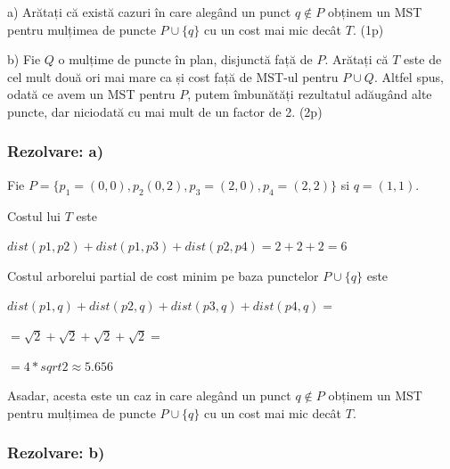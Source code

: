 \documentclass[a4paper]{article}
\begin{document}
a) Arătați că există cazuri în care alegând un punct $q \notin P$ obținem un
MST pentru mulțimea de puncte $P\cup\{q\}$ cu un cost mai mic decât
$T$. \hfill (1p)

b) Fie $Q$ o mulțime de puncte în plan, disjunctă față de $P$. Arătați că $T$
este de cel mult două ori mai mare ca și cost față de MST-ul pentru
$P \cup Q$. Altfel spus, odată ce avem un MST pentru $P$, putem îmbunătăți rezultatul adăugând alte puncte, dar niciodată cu mai mult de
un factor de 2. \hfill (2p)

\subsubsection*{Rezolvare: a)}
\begin{flushleft}
Fie $P=\{p_{1}=(0,0), p_{2}(0,2), p_{3}=(2,0), p_{4}=(2,2)\}$ si $q=(1,1)$.

Costul lui $T$ este 
\begin{center}
$dist(p1, p2) + dist(p1, p3) + dist(p2,p4) = 2+2+2 = 6$ 
\end{center}


Costul arborelui partial de cost minim pe baza punctelor $P \cup \{q\}$ este
\begin{center}
$dist(p1,q) + dist(p2,q) + dist(p3,q) + dist(p4,q)=$

$=\sqrt{2} + \sqrt{2} + \sqrt{2} + \sqrt{2}=$

$=4 * sqrt{2} \approx 5.656$
\end{center}

Asadar, acesta este un caz in care alegând un punct $q \notin P$ obținem un
MST pentru mulțimea de puncte $P\cup\{q\}$ cu un cost mai mic decât
$T$.

\end{flushleft}

\subsubsection*{Rezolvare: b)}
\end{document}

